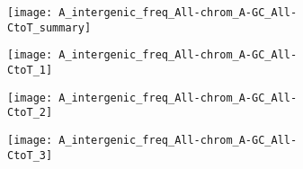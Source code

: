 \documentclass{article}
\begin{document}
\begin{figure}
    \centering
    
    \begin{subfigure}[b]{0.385\textwidth}
        \centering
        \texttt{[image: A\_intergenic\_freq\_All-chrom\_A-GC\_All-CtoT\_summary]}
        \caption{}
        \label{fig:c-t:summary}
    \end{subfigure}
    \hspace{1em}
    \begin{subfigure}[b]{0.4\textwidth}
        \centering
        \texttt{[image: A\_intergenic\_freq\_All-chrom\_A-GC\_All-CtoT\_1]}
        \caption{}
        \label{fig:c-t:1}
    \end{subfigure}
    \vfill
    \begin{subfigure}[b]{0.4\textwidth}
        \centering
        \texttt{[image: A\_intergenic\_freq\_All-chrom\_A-GC\_All-CtoT\_2]}
        \caption{}
        \label{fig:c-t:2}
    \end{subfigure}
    \hspace{1em}
    \begin{subfigure}[b]{0.4\textwidth}
        \centering
         \texttt{[image: A\_intergenic\_freq\_All-chrom\_A-GC\_All-CtoT\_3]}
        \caption{}
        \label{fig:c-t:3}
    \end{subfigure}
\end{figure}
\end{document}
